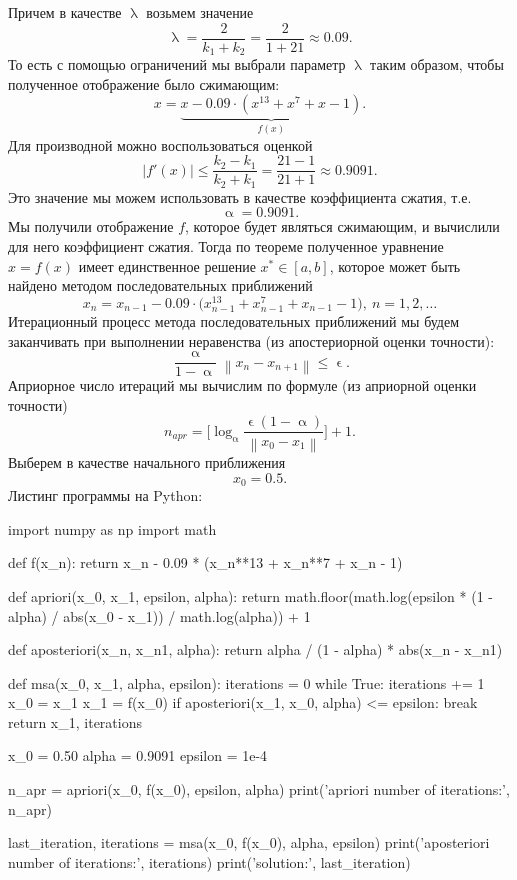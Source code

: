 \documentclass[a4paper, 12pt]{report}
\newcommand\Norm[1]{\left\| #1 \right\|}
\renewcommand{\leq}{\leqslant}
\renewcommand{\alpha}{\upalpha}
\renewcommand{\lambda}{\uplambda}
\renewcommand{\epsilon}{\upvarepsilon}
\begin{document}
	Причем в качестве $\lambda$ возьмем значение $$\lambda = \dfrac{2}{k_1 + k_2} = \dfrac{2}{1 + {21}} \approx 0.09.$$
	То есть с помощью ограничений мы выбрали параметр $\lambda$ таким образом, чтобы полученное отображение было сжимающим:
	$$x = \underbrace{x - 0.09 \cdot (x^{13} + x^7 + x - 1)}_{f(x)}.$$
	Для производной можно воспользоваться оценкой
	$$|f'(x)| \leq \dfrac{k_2-k_1}{k_2 + k_1}  = \dfrac{21 - 1}{21 + 1}\approx 0.9091.$$ 
	Это значение мы можем использовать в качестве коэффициента сжатия, т.е. $$\alpha = 0.9091.$$
	Мы получили отображение $f$, которое будет являться сжимающим, и вычислили для него коэффициент сжатия. Тогда по теореме полученное уравнение $x = f(x)$ имеет единственное решение $x^*\in[a,b]$, которое может быть найдено методом последовательных приближений $$x_n = x_{n-1} - 0.09 \cdot \Big(x_{n-1}^{13} + x_{n-1}^7 + x_{n-1} - 1\Big),\ n=1,2,\ldots$$
	Итерационный процесс метода последовательных приближений мы будем заканчивать при выполнении неравенства (из апостериорной оценки точности):
	$$\dfrac{\alpha}{1 - \alpha}\Norm{x_n - x_{n+1}} \leq \epsilon.$$ 
	Априорное число итераций мы вычислим по формуле (из априорной оценки точности) $$n_{apr} = \Big[\log_\alpha \dfrac{\epsilon(1-\alpha)}{\Norm{x_0 - x_1}}\Big] + 1.$$
	Выберем в качестве начального приближения $$x_0 = 0.5.$$
	Листинг программы на Python:
	\begin{python}
	import numpy as np
    import math

    def f(x_n):
        return x_n - 0.09 * (x_n**13 + x_n**7 + x_n - 1)

    def apriori(x_0, x_1, epsilon, alpha):
        return math.floor(math.log(epsilon * (1 - alpha) / abs(x_0 - x_1)) / math.log(alpha)) + 1

    def aposteriori(x_n, x_n1, alpha):
        return alpha / (1 - alpha) * abs(x_n - x_n1)

    def msa(x_0, x_1, alpha, epsilon):
        iterations = 0
        while True:
        iterations += 1
            x_0 = x_1
            x_1 = f(x_0)
            if aposteriori(x_1, x_0, alpha) <= epsilon:
                break
        return x_1, iterations

    x_0 = 0.50
    alpha = 0.9091
    epsilon = 1e-4

    n_apr = apriori(x_0, f(x_0), epsilon, alpha)
    print('apriori number of iterations:', n_apr)

    last_iteration, iterations = msa(x_0, f(x_0), alpha, epsilon)
    print('aposteriori number of iterations:', iterations)
    print('solution:', last_iteration)\end{python}
\end{document}
